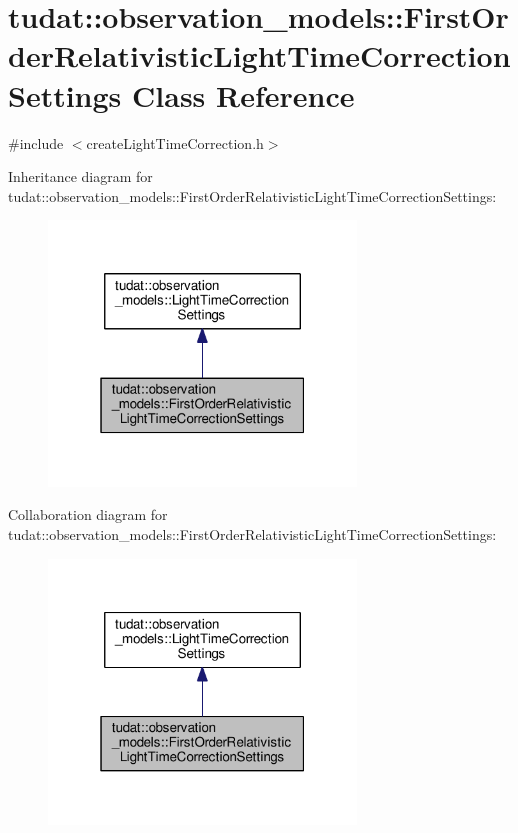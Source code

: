 \hypertarget{classtudat_1_1observation__models_1_1FirstOrderRelativisticLightTimeCorrectionSettings}{}\section{tudat\+:\+:observation\+\_\+models\+:\+:First\+Order\+Relativistic\+Light\+Time\+Correction\+Settings Class Reference}
\label{classtudat_1_1observation__models_1_1FirstOrderRelativisticLightTimeCorrectionSettings}


{\ttfamily \#include $<$create\+Light\+Time\+Correction.\+h$>$}



Inheritance diagram for tudat\+:\+:observation\+\_\+models\+:\+:First\+Order\+Relativistic\+Light\+Time\+Correction\+Settings\+:
\nopagebreak
\begin{figure}[H]
\begin{center}
\leavevmode
\includegraphics[width=232pt]{classtudat_1_1observation__models_1_1FirstOrderRelativisticLightTimeCorrectionSettings__inherit__graph}
\end{center}
\end{figure}


Collaboration diagram for tudat\+:\+:observation\+\_\+models\+:\+:First\+Order\+Relativistic\+Light\+Time\+Correction\+Settings\+:
\nopagebreak
\begin{figure}[H]
\begin{center}
\leavevmode
\includegraphics[width=232pt]{classtudat_1_1observation__models_1_1FirstOrderRelativisticLightTimeCorrectionSettings__coll__graph}
\end{center}
\end{figure}

